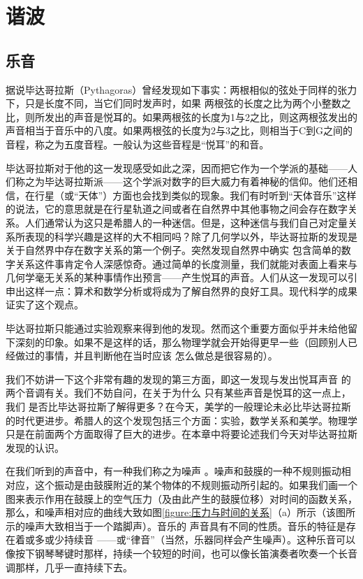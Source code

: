 \chapter{谐波}

\section{乐音}

据说毕达哥拉斯（Pythagoras）曾经发现如下事实：两根相似的弦处于同样的张力下，只是长度不同，当它们同时发声时，如果 两根弦的长度之比为两个小整数之比，则所发出的声音是悦耳的。如果两根弦的长度为1与2之比，则这两根弦发出的声音相当于音乐中的八度。如果两根弦的长度为2与3之比，则相当于C到G之间的音程，称之为五度音程。一般认为这些音程是“悦耳”的和音。

毕达哥拉斯对于他的这一发现感受如此之深，因而把它作为一个学派的基础——人们称之为毕达哥拉斯派——这个学派对数字的巨大威力有着神秘的信仰。他们还相信，在行星（或“天体”）方面也会找到类似的现象。我们有时听到“天体音乐”这样的说法，它的意思就是在行星轨道之间或者在自然界中其他事物之间会存在数字关系。人们通常认为这只是希腊人的一种迷信。但是，这种迷信与我们自己对定量关系所表现的科学兴趣是这样的大不相同吗？除了几何学以外，毕达哥拉斯的发现是关于自然界中存在数字关系的第一个例子。突然发现自然界中确实 包含简单的数字关系这件事肯定令人深感惊奇。通过简单的长度测量，我们就能对表面上看来与几何学毫无关系的某种事情作出预言——产生悦耳的声音。人们从这一发现可以引申出这样一点：算术和数学分析或将成为了解自然界的良好工具。现代科学的成果证实了这个观点。

毕达哥拉斯只能通过实验观察来得到他的发现。然而这个重要方面似乎并未给他留下深刻的印象。如果不是这样的话，那么物理学就会开始得更早一些（回顾别人已经做过的事情，并且判断他在当时应该 怎么做总是很容易的）。

我们不妨讲一下这个非常有趣的发现的第三方面，即这一发现与发出悦耳声音 的两个音调有关。我们不妨自问，在关于为什么 只有某些声音是悦耳的这一点上，我们 是否比毕达哥拉斯了解得更多？在今天，美学的一般理论未必比毕达哥拉斯的时代更进步。希腊人的这个发现包括三个方面：实验，数学关系和美学。物理学只是在前面两个方面取得了巨大的进步。在本章中将要论述我们今天对毕达哥拉斯发现的认识。

在我们听到的声音中，有一种我们称之为噪声 。噪声和鼓膜的一种不规则振动相对应，这个振动是由鼓膜附近的某个物体的不规则振动所引起的。如果我们画一个图来表示作用在鼓膜上的空气压力（及由此产生的鼓膜位移）对时间的函数关系，那么，和噪声相对应的曲线大致如图\ref{figure:压力与时间的关系}（a）所示（该图所示的噪声大致相当于一个踏脚声）。音乐的 声音具有不同的性质。音乐的特征是存在着或多或少持续音 ——或“律音”（当然，乐器同样会产生噪声）。这种乐音可以像按下钢琴琴键时那样，持续一个较短的时间，也可以像长笛演奏者吹奏一个长音调那样，几乎一直持续下去。

